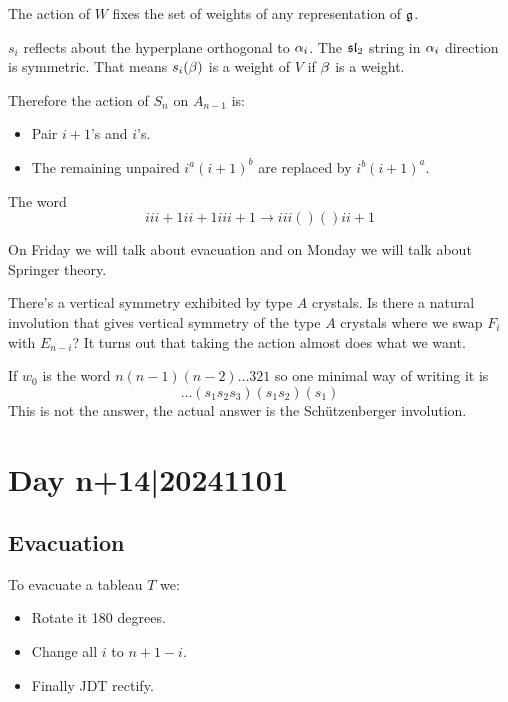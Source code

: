 \documentclass[12pt]{memoir}
\begin{document}
\begin{Lem}
    The action of $W$ fixes the set of weights of any representation of $\mathfrak{g}$.
\end{Lem}

\begin{ptcbp}
    $s_i$ reflects about the hyperplane orthogonal to $\alpha_i$. The $\mathfrak{sl}_2$ string in $\alpha_i$ direction is symmetric. That means $s_i(\beta)$ is a weight of $V$ if $\beta$ is a weight.
\end{ptcbp}

Therefore the action of $S_n$ on $A_{n-1}$ is:

\begin{itemize}
    \item Pair $i+1$'s and $i$'s.
    \item The remaining unpaired $i^a(i+1)^b$ are replaced by $i^b(i+1)^a$.
\end{itemize}

The word 
$$iii+1ii+1iii+1\to iii()()ii+1$$

On Friday we will talk about evacuation and on Monday we will talk about Springer theory.\par

There's a vertical symmetry exhibited by type $A$ crystals. Is there a natural involution that gives vertical symmetry of the type $A$ crystals where we swap $F_i$ with $E_{n-i}$? It turns out that taking the action almost does what we want.\par
If $w_0$ is the word $n(n-1)(n-2)\dots321$ so one minimal way of writing it is 
$$\dots(s_1s_2s_3)(s_1s_2)(s_1)$$
This is not the answer, the actual answer is the Schützenberger involution.

\section{Day n+14|20241101}

\subsection{Evacuation}

To evacuate a tableau $T$ we:
\begin{itemize}
    \item Rotate it 180 degrees.
    \item Change all $i$ to $n+1-i$.
    \item Finally JDT rectify.
\end{itemize}
\end{document}
